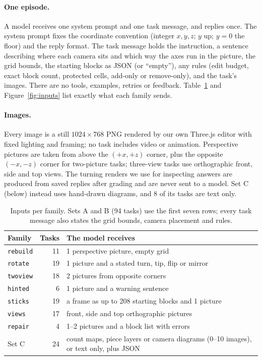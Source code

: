 \documentclass[10pt,twocolumn,letterpaper]{article}
\newcommand{\task}[1]{\texttt{\small #1}}
\begin{document}
\paragraph{One episode.} A model receives one system prompt and one task message, and replies once. The system prompt fixes the coordinate convention (integer $x,y,z$; $y$ up; $y{=}0$ the floor) and the reply format. The task message holds the instruction, a sentence describing where each camera sits and which way the axes run in the picture, the grid bounds, the starting blocks as JSON (or ``empty''), any rules (edit budget, exact block count, protected cells, add-only or remove-only), and the task's images. There are no tools, examples, retries or feedback. Table~\ref{tab:families} and Figure~\ref{fig:inputs} list exactly what each family sends.

\paragraph{Images.} Every image is a still $1024{\times}768$ PNG rendered by our own Three.js editor with fixed lighting and framing; no task includes video or animation. Perspective pictures are taken from above the $(+x,+z)$ corner, plus the opposite $(-x,-z)$ corner for two-picture tasks; three-view tasks use orthographic front, side and top views. The turning renders we use for inspecting answers are produced from saved replies after grading and are never sent to a model. Set C (below) instead uses hand-drawn diagrams, and 8 of its tasks are text only.

\begin{table}[t]
\centering\small
\setlength{\tabcolsep}{3pt}
\begin{tabular}{@{}l r p{5.3cm}@{}}
\toprule
Family & Tasks & The model receives \\
\midrule
\task{rebuild} & 11 & 1 perspective picture, empty grid \\
\task{rotate} & 19 & 1 picture and a stated turn, tip, flip or mirror \\
\task{twoview} & 18 & 2 pictures from opposite corners \\
\task{hinted} & 6 & 1 picture and a warning sentence \\
\task{sticks} & 19 & a frame as up to 208 starting blocks and 1 picture \\
\task{views} & 17 & front, side and top orthographic pictures \\
\task{repair} & 4 & 1--2 pictures and a block list with errors \\
\midrule
Set C & 24 & count maps, piece layers or camera diagrams (0--10 images), or text only, plus JSON \\
\bottomrule
\end{tabular}
\caption{Inputs per family. Sets A and B (94 tasks) use the first seven rows; every task message also states the grid bounds, camera placement and rules.}
\label{tab:families}
\end{table}
\end{document}
